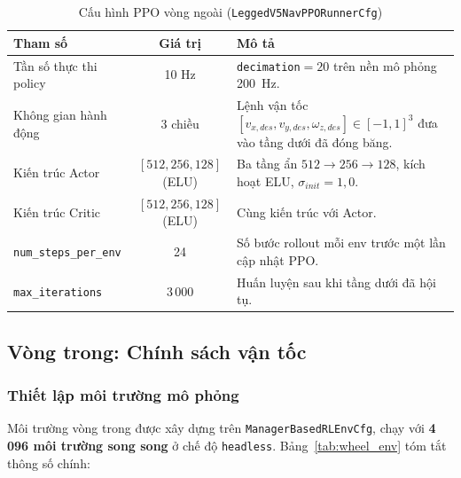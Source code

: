 \begin{table}[H]
    \centering
    \caption{Cấu hình PPO vòng ngoài (\texttt{LeggedV5NavPPORunnerCfg})}
    \label{tab:outer_param}
    \renewcommand{\arraystretch}{1.3}
    \begin{tabular}{|p{4.0cm}|c|p{7.5cm}|}
    \hline
    \textbf{Tham số} & \textbf{Giá trị} & \textbf{Mô tả} \\
    \hline
    Tần số thực thi policy & 10 Hz &
    \texttt{decimation}${=}20$ trên nền mô phỏng 200~Hz. \\
    \hline
    Không gian hành động & 3 chiều &
    Lệnh vận tốc $[v_{x,des},v_{y,des},\omega_{z,des}]\in[-1,1]^3$ đưa vào
    tầng dưới đã đóng băng. \\
    \hline
    Kiến trúc Actor & $[512,256,128]$ (ELU) &
    Ba tầng ẩn $512{\to}256{\to}128$, kích hoạt ELU,
    $\sigma_{init}{=}1{,}0$. \\
    \hline
    Kiến trúc Critic & $[512,256,128]$ (ELU) &
    Cùng kiến trúc với Actor. \\
    \hline
    \texttt{num\_steps\_per\_env} & 24 &
    Số bước rollout mỗi env trước một lần cập nhật PPO. \\
    \hline
    \texttt{max\_iterations} & 3\,000 &
    Huấn luyện sau khi tầng dưới đã hội tụ. \\
    \hline
    \end{tabular}
\end{table}

\subsection{Vòng trong: Chính sách vận tốc }
\label{sec:inner_rl}

\subsubsection{Thiết lập môi trường mô phỏng}

Môi trường vòng trong được xây dựng trên \texttt{ManagerBasedRLEnvCfg}, 
chạy với \textbf{4\,096 môi trường song song} ở chế độ \texttt{headless}.
Bảng~\ref{tab:wheel_env} tóm tắt thông số chính:


